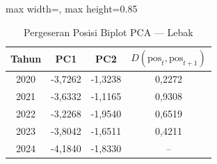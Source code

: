 \begin{table}[H]
\centering
\caption{Pergeseran Posisi Biplot PCA --- Lebak} \label{tab:appjarak_pca_skor_lebak}
\begin{adjustbox}{max width=\textwidth, max height=0.85\textheight}
\begin{tabular}{|c|c|c|c|}
\hline
\textbf{Tahun} & \textbf{PC1} & \textbf{PC2} & \textbf{$D(\text{pos}_t, \text{pos}_{t+1})$} \\
\hline
2020 & -3,7262 & -1,3238 & 0,2272 \\
2021 & -3,6332 & -1,1165 & 0,9308 \\
2022 & -3,2268 & -1,9540 & 0,6519 \\
2023 & -3,8042 & -1,6511 & 0,4211 \\
2024 & -4,1840 & -1,8330 & -- \\
\hline
\end{tabular}
\end{adjustbox}
\end{table}
